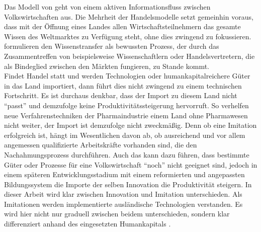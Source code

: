 %
Das Modell von \cite{Grossman.1990c} geht von einem aktiven Informationsfluss zwischen Volkswirtschaften aus. Die Mehrheit der Handelsmodelle setzt gemeinhin voraus, dass mit der Öffnung eines Landes allen Wirtschaftsteilnehmern das gesamte Wissen des Weltmarktes zu Verfügung steht, ohne dies zwingend zu fokussieren. \cite{Grossman.1990c} formulieren den Wissenstransfer als bewussten Prozess, der durch das Zusammentreffen von beispielsweise Wissenschaftlern oder Handelsvertretern, die als Bindeglied zwischen den Märkten fungieren, zu Stande kommt.\\
%
Findet Handel statt und werden Technologien oder humankapitalreichere Güter in das Land importiert, dann führt dies nicht zwingend zu einem technischen Fortschritt. Es ist durchaus denkbar, dass der Import zu diesem Land nicht "`passt"' und demzufolge keine Produktivitätssteigerung hervorruft. So verhelfen neue Verfahrenstechniken der Pharmaindustrie einem Land ohne Pharmawesen nicht weiter, der Import ist demzufolge nicht zweckmäßig. Denn ob eine Imitation erfolgreich ist, hängt im Wesentlichen davon ab, ob ausreichend und vor allem angemessen qualifizierte Arbeitskräfte vorhanden sind, die den Nachahmungsprozess durchführen. Auch das kann dazu führen, dass bestimmte Güter oder Prozesse für eine Volkswirtschaft "`noch"' nicht geeignet sind, jedoch in einem späteren Entwicklungsstadium mit einem reformierten und angepassten Bildungssystem die Importe der selben Innovation die Produktivität steigern.
%
In dieser Arbeit wird klar zwischen Innovation und Imitation unterschieden. Als Imitationen werden implementierte ausländische Technologien verstanden. Es wird hier nicht nur graduell zwischen beidem unterschieden, sondern klar differenziert anhand des eingesetzten Humankapitals \cite[S.883]{Cohen.1989,Griffith.2004}.
%